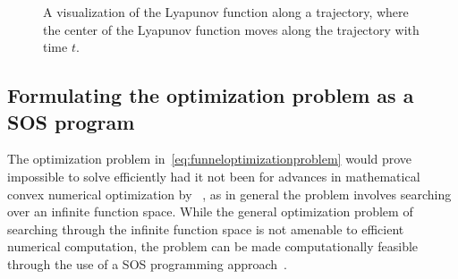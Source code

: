 \begin{figure}
  \caption{A visualization of the Lyapunov function along a trajectory, where
    the center of the Lyapunov function moves along the trajectory with time
    \(t\).}
\end{figure}


\subsection{Formulating the optimization problem as a SOS program}

The optimization problem in~\cref{eq:funneloptimizationproblem} would prove
impossible to solve efficiently had it not been for advances in mathematical
convex numerical optimization by
\citeauthor{parilloStructuredSemidefinitePrograms}~\cite{parilloStructuredSemidefinitePrograms},
as in general the problem involves searching over an infinite function space.
While the general optimization problem of searching through the infinite
function space is not amenable to efficient numerical computation, the problem
can be made computationally feasible through the use of a \ac{SOS} programming
approach~\cite{tedrakeLQRtreesFeedbackMotion2009}.

